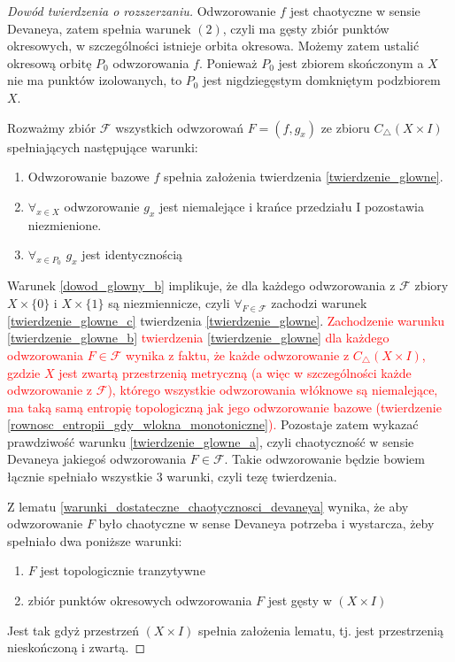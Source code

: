 \documentclass[licencjacka]{pwr_wmat_praca_dyplomowa}
\theoremstyle{plain}
\numberwithin{theorem}{chapter}
\theoremstyle{definition}
\numberwithin{theorem}{chapter}
\begin{document}
\begin{proof}[Dowód twierdzenia o rozszerzaniu]
Odwzorowanie $f$ jest chaotyczne w sensie Devaneya, zatem spełnia warunek $(2)$, czyli ma gęsty zbiór punktów okresowych, w szczególności istnieje orbita okresowa.
Możemy zatem ustalić okresową orbitę $P_0$ odwzorowania $f$. Ponieważ $P_0$ jest zbiorem skończonym a $X$ nie ma punktów izolowanych, to $P_0$ jest nigdziegęstym domkniętym podzbiorem $X$.

Rozważmy zbiór $\mathcal{F}$ wszystkich odwzorowań $F = (f, g_x)$ ze zbioru $C_\triangle(X \times I)$ spełniających następujące warunki:
\begin{enumerate}
\item\label{dowod_glowny_a} Odwzorowanie bazowe $f$ spełnia założenia twierdzenia \ref{twierdzenie_glowne}.
\item\label{dowod_glowny_b} $\forall_{x \in X}$ odwzorowanie $g_x$ jest niemalejące i krańce przedziału I pozostawia niezmienione.
\item\label{dowod_glowny_c} $\forall_{x \in P_0}$ $g_x$ jest identycznością 
\end{enumerate}

Warunek \ref{dowod_glowny_b} implikuje, że dla każdego odwzorowania z $\mathcal{F}$ zbiory $X \times \{0\}$ i $X \times \{1\}$ są niezmiennicze, czyli $\forall_{F \in \mathcal{F}}$ zachodzi warunek \ref{twierdzenie_glowne_c}  twierdzenia \ref{twierdzenie_glowne}.
\textcolor{red}{Zachodzenie warunku \ref{twierdzenie_glowne_b} twierdzenia \ref{twierdzenie_glowne} dla każdego odwzorowania $F \in \mathcal{F}$ wynika z faktu, że każde odwzorowanie z $C_\triangle(X \times I)$, gzdzie $X$ jest zwartą przestrzenią metryczną (a więc w szczególności każde odwzorowanie z $\mathcal{F}$), którego wszystkie odwzorowania włóknowe są niemalejące, ma taką samą entropię topologiczną jak jego odwzorowanie bazowe (twierdzenie \ref{rownosc_entropii_gdy_wlokna_monotoniczne}).}
Pozostaje zatem wykazać prawdziwość warunku \ref{twierdzenie_glowne_a}, czyli chaotyczność w sensie Devaneya jakiegoś odwzorowania $F \in \mathcal{F}$. Takie odwzorowanie będzie bowiem łącznie spełniało wszystkie 3 warunki, czyli tezę twierdzenia.

Z lematu \ref{warunki_dostateczne_chaotycznosci_devaneya} wynika, że aby odwzorowanie $F$ było chaotyczne w sense Devaneya potrzeba i wystarcza, żeby spełniało dwa poniższe warunki:
\begin{enumerate}
\item \label{devaney_pierwsza_wlasnosc} $F$ jest topologicznie tranzytywne
\item \label{devaney_druga_wlasnosc} zbiór punktów okresowych odwzorowania $F$ jest gęsty w $(X \times I)$
\end{enumerate}
Jest tak gdyż przestrzeń $(X \times I)$ spełnia założenia lematu, tj. jest przestrzenią nieskończoną i zwartą.


\end{proof}
\end{document}

